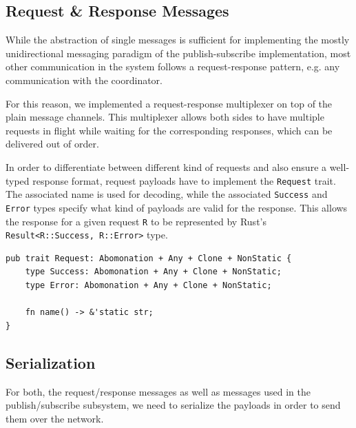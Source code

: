 \subsection{Request \& Response Messages} \label{sec:reqresp}

While the abstraction of single messages is sufficient for implementing the
mostly unidirectional messaging paradigm of the publish-subscribe implementation,
most other communication in the system follows a request-response pattern,
e.g. any communication with the coordinator.

For this reason, we implemented a request-response multiplexer on
top of the plain message channels. This multiplexer allows both sides to have
multiple requests in flight while waiting for the corresponding responses,
which can be delivered out of order.

In order to differentiate between different kind of requests and also ensure a
well-typed response format, request payloads have to implement the \lstinline{Request}
trait. The associated name is used for decoding, while the associated \lstinline{Success}
and \lstinline{Error} types specify what kind of payloads are valid for the response.
This allows the response for a given request \lstinline{R} to be represented by
Rust's \lstinline{Result<R::Success, R::Error>} type.

\begin{lstlisting}[caption={[Request trait]In order for a type to be used as a
request message, it needs to implement the \lstinline{Request} trait. The name allows
request handlers to differentiate between different types of requests, while the associated
types forces them to issue well-formed responses.
The trait bounds are explained in section \ref{sec:serialization}.}]
pub trait Request: Abomonation + Any + Clone + NonStatic {
    type Success: Abomonation + Any + Clone + NonStatic;
    type Error: Abomonation + Any + Clone + NonStatic;

    fn name() -> &'static str;
}
\end{lstlisting}

\subsection{Serialization} \label{sec:serialization}

For both, the request/response messages as well as messages used in the publish/subscribe
subsystem, we need to serialize the payloads in order to send them over the network.

